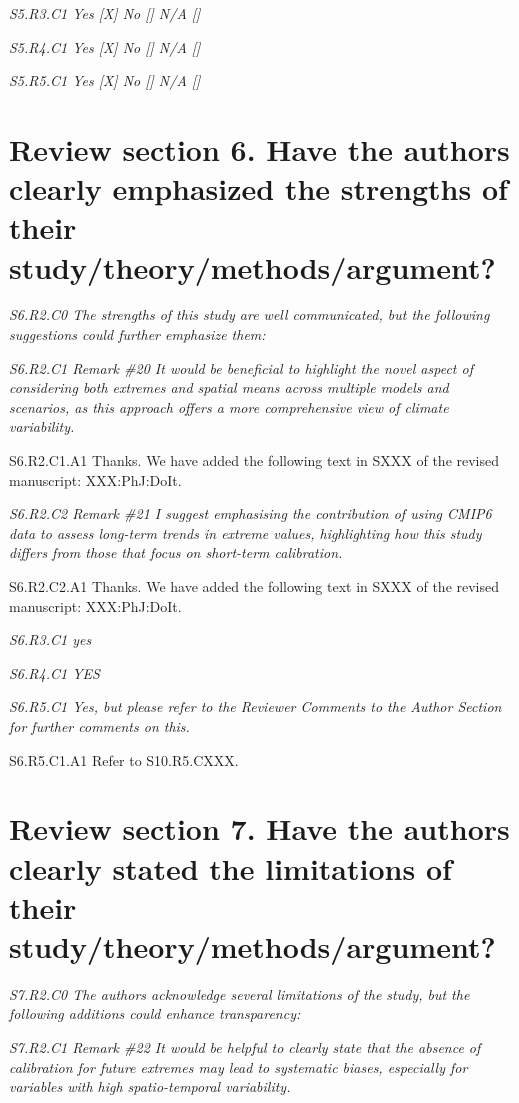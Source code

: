 \documentclass[a4paper,10pt]{article}
\begin{document}
	\emph{S5.R3.C1 Yes [X] No [] N/A []}

	\emph{S5.R4.C1 Yes [X] No [] N/A []}

	\emph{S5.R5.C1 Yes [X] No [] N/A []}

	\section*{Review section 6. Have the authors clearly emphasized the strengths of their study/theory/methods/argument?}

	\emph{S6.R2.C0 The strengths of this study are well communicated, but the following suggestions could further emphasize them:}

	\emph{S6.R2.C1 Remark \#20 It would be beneficial to highlight the novel aspect of considering both extremes and spatial means across multiple models and scenarios, as this approach offers a more comprehensive view of climate variability.}

	S6.R2.C1.A1 Thanks. We have added the following text in SXXX of the revised manuscript: XXX:PhJ:DoIt.

	\emph{S6.R2.C2 Remark \#21 I suggest emphasising the contribution of using CMIP6 data to assess long-term trends in extreme values, highlighting how this study differs from those that focus on short-term calibration.}

	S6.R2.C2.A1 Thanks. We have added the following text in SXXX of the revised manuscript: XXX:PhJ:DoIt.

	\emph{S6.R3.C1 yes}

	\emph{S6.R4.C1 YES}

	\emph{S6.R5.C1 Yes, but please refer to the Reviewer Comments to the Author Section for further comments on this.}

	S6.R5.C1.A1 Refer to S10.R5.CXXX.

	\section*{Review section 7. Have the authors clearly stated the limitations of their study/theory/methods/argument?}

	\emph{S7.R2.C0 The authors acknowledge several limitations of the study, but the following additions could enhance transparency:}

	\emph{S7.R2.C1 Remark \#22 It would be helpful to clearly state that the absence of calibration for future extremes may lead to systematic biases, especially for variables with high spatio-temporal variability.}
\end{document}
